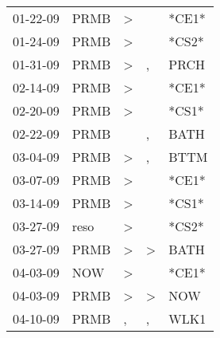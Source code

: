 \begin{supertabular}{p{0.07\textwidth}p{0.06\textwidth}p{0.02\textwidth}p{0.02\textwidth}p{0.06\textwidth}}
          01-22-09\textsuperscript{} &           PRMB\textsuperscript{} &     \textgreater &                  &                            *CE1* \\
          01-24-09\textsuperscript{} &           PRMB\textsuperscript{} &     \textgreater &                  &                            *CS2* \\
          01-31-09\textsuperscript{} &           PRMB\textsuperscript{} &     \textgreater &                , &           PRCH\textsuperscript{} \\
          02-14-09\textsuperscript{} &           PRMB\textsuperscript{} &     \textgreater &                  &                            *CE1* \\
          02-20-09\textsuperscript{} &           PRMB\textsuperscript{} &     \textgreater &                  &                            *CS1* \\
          02-22-09\textsuperscript{} &           PRMB\textsuperscript{} &                  &                , &           BATH\textsuperscript{} \\
          03-04-09\textsuperscript{} &           PRMB\textsuperscript{} &     \textgreater &                , &           BTTM\textsuperscript{} \\
          03-07-09\textsuperscript{} &           PRMB\textsuperscript{} &     \textgreater &                  &                            *CE1* \\
          03-14-09\textsuperscript{} &           PRMB\textsuperscript{} &     \textgreater &                  &                            *CS1* \\
          03-27-09\textsuperscript{} &           reso\textsuperscript{} &     \textgreater &                  &                            *CS2* \\
          03-27-09\textsuperscript{} &           PRMB\textsuperscript{} &     \textgreater &     \textgreater &           BATH\textsuperscript{} \\
          04-03-09\textsuperscript{} &            NOW\textsuperscript{} &     \textgreater &                  &                            *CE1* \\
          04-03-09\textsuperscript{} &           PRMB\textsuperscript{} &     \textgreater &     \textgreater &            NOW\textsuperscript{} \\
          04-10-09\textsuperscript{} &           PRMB\textsuperscript{} &                , &                , &           WLK1\textsuperscript{} \\

\end{supertabular}
